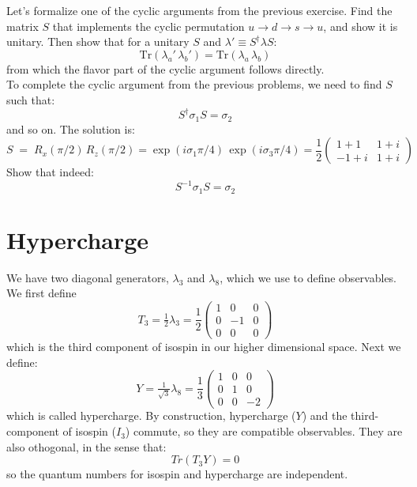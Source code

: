 \documentclass[12pt]{article}
\begin{document}
\exercise Let's formalize one of the cyclic arguments from the
previous exercise. Find the matrix $S$ that implements the cyclic
permutation $u\to d\to s\to u$, and show it is unitary. Then show
that for a unitary $S$ and $\lambda' \equiv S^\dagger \lambda S$:
\begin{equation*}
  \mathrm{Tr}(\lambda_a'\,\lambda_b') = \mathrm{Tr}(\lambda_a\,\lambda_b)
\end{equation*}
from which the flavor part of the cyclic argument follows directly.\\[5pt]

\exercise To complete the cyclic argument from the previous problems,
we need to find $S$ such that:
$$S^\dagger \sigma_1 S = \sigma_2$$
and so on.  The solution is:
$$S \; = \; R_x(\pi/2) \, R_z(\pi/2) =
\exp(i\sigma_1 \pi/4) \, \exp(i\sigma_3 \pi/4)
=
\frac{1}{2}\begin{pmatrix} 1+1 & 1+i \\ -1+i & 1+i \end{pmatrix}$$
Show that indeed:
$$S^{-1} \sigma_1 S = \sigma_2$$
  

\section*{Hypercharge}

We have two diagonal generators, $\lambda_3$ and $\lambda_8$, which we use to define observables.
We first define
\begin{equation*}
  T_3 = \tfrac{1}{2}\lambda_3 = \frac{1}{2}\begin{pmatrix} 1 & 0 & 0 \\ 0 & -1 & 0 \\ 0 & 0 & 0 \end{pmatrix}
\end{equation*}
which is the third component of isospin in our higher dimensional space.  Next we define:
\begin{equation*}
  Y = \tfrac{1}{\sqrt{3}}\lambda_8 = \frac{1}{3}\begin{pmatrix} 1 & 0 & 0 \\ 0 & 1 & 0 \\ 0 & 0 & -2 \end{pmatrix}
\end{equation*}
which is called hypercharge.  By construction, hypercharge ($Y$) and
the third-component of isospin ($I_3$) commute, so they are compatible
observables.  They are also othogonal, in the sense that:
$$Tr(T_3 Y) = 0$$
so the quantum numbers for isospin and hypercharge are independent.
\end{document}
